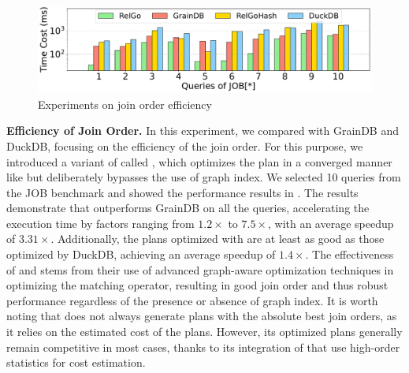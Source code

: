 \begin{figure}[ht]
    \centering
    \includegraphics[width=\linewidth]{./figures/exp/hash_plan_job.pdf}
    \caption{Experiments on join order efficiency}
    \label{fig:exp-hash-plan}
\end{figure}

\noindent\textbf{Efficiency of Join Order.}
In this experiment, we compared \name with GrainDB and DuckDB, focusing on the efficiency of the join order. For this purpose, we introduced a variant of \name called \relgohash, which optimizes the plan in a converged manner like \name but deliberately bypasses the use of graph index. We selected 10 queries from the JOB benchmark and showed the performance results in .
The results demonstrate that \name outperforms GrainDB on all the queries, accelerating the execution time by factors ranging from $1.2\times$ to $7.5\times$, with an average speedup of $3.31\times$. Additionally, the plans optimized with \relgohash are at least as good as those optimized by DuckDB, achieving an average speedup of $1.4\times$. The effectiveness of \name and \relgohash stems from their use of advanced graph-aware optimization techniques in optimizing the matching operator, resulting in good join order and thus robust performance regardless of the presence or absence of graph index.
It is worth noting that \name does not always generate plans with the absolute best join orders, as it relies on the estimated cost of the plans. However, its optimized plans generally remain competitive in most cases, thanks to its integration of \glogue that use high-order statistics for cost estimation.



